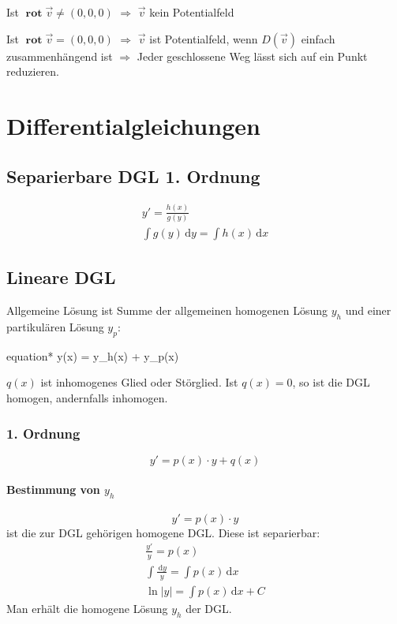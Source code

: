 \documentclass[12pt]{article}
\newcommand{\ud}{\,\mathrm{d}}
\DeclareMathOperator{\rot}{\mathbf{rot}}
\begin{document}
\begin{multicols*}{3}
					Ist $\rot \vec{v} \neq (0,0,0)$ $\Rightarrow$ $\vec{v}$ kein Potentialfeld
					
					Ist $\rot \vec{v} = (0,0,0)$ $\Rightarrow$ $\vec{v}$ ist Potentialfeld, wenn $D(\vec{v})$ einfach zusammenhängend ist
					$\Rightarrow$ Jeder geschlossene Weg lässt sich auf ein Punkt reduzieren.
		\section{Differentialgleichungen} %
			\subsection{Separierbare DGL 1. Ordnung} %
				\begin{gather*}
					y' = \frac{h(x)}{g(y)} \\
					\int g(y) \ud y = \int h(x) \ud x
				\end{gather*}
			\subsection{Lineare DGL} %
				Allgemeine Lösung ist Summe der allgemeinen homogenen Lösung $y_h$
				und einer partikulären Lösung $y_p$:
				\begin{empheq}[box=\shadowbox]{equation*}
					y(x) = y_h(x) + y_p(x)
				\end{empheq}
				
				$q(x)$ ist inhomogenes Glied oder Störglied.
				Ist $q(x) = 0$, so ist die DGL homogen, andernfalls inhomogen.
				
				\subsubsection{1. Ordnung} %
					\[
						y' = p(x) \cdot y + q(x)
					\]
					
					\paragraph{Bestimmung von $y_h$} %
						\[
							y' = p(x) \cdot y
						\]
						ist die zur DGL gehörigen homogene DGL. Diese ist separierbar:
						\begin{gather*}
							\frac{y'}{y} = p(x) \\
							\int \frac{\ud y}{y} = \int p(x) \ud x \\
							\ln |y| = \int p(x) \ud x + C
						\end{gather*}
						Man erhält die homogene Lösung $y_h$ der DGL.
					

\end{multicols*}
\end{document}
